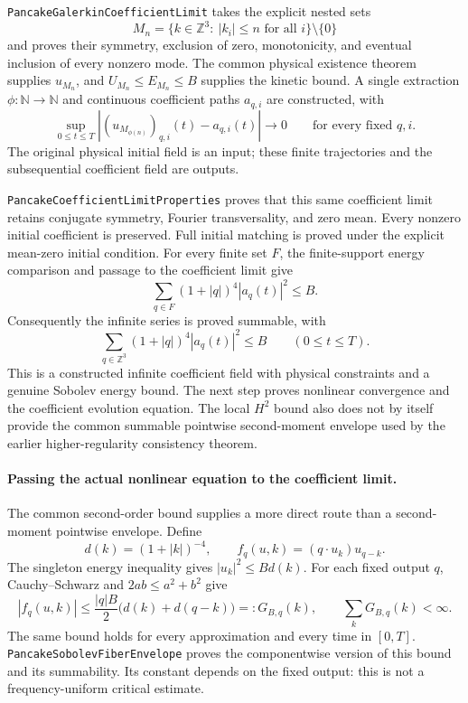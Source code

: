 \documentclass[11pt]{article}
\theoremstyle{definition}
\begin{document}
\texttt{PancakeGalerkinCoefficientLimit} takes the explicit nested
sets
\[
 M_n=\{k\in\mathbb Z^3:\ |k_i|\le n\text{ for all }i\}\setminus\{0\}
\]
and proves their symmetry, exclusion of zero, monotonicity, and
eventual inclusion of every nonzero mode. The common physical
existence theorem supplies $u_{M_n}$, and $U_{M_n}\le E_{M_n}\le B$
supplies the kinetic bound. A single extraction $\phi:\mathbb N\to
\mathbb N$ and continuous coefficient paths $a_{q,i}$ are constructed,
with
\[
 \sup_{0\le t\le T}
       |(u_{M_{\phi(n)}})_{q,i}(t)-a_{q,i}(t)|
            \longrightarrow0
       \qquad\text{for every fixed }q,i .
\]
The original physical initial field is an input; these finite
trajectories and the subsequential coefficient field are outputs.

\texttt{PancakeCoefficientLimitProperties} proves that this same
coefficient limit retains conjugate symmetry, Fourier transversality,
and zero mean. Every nonzero initial coefficient is preserved.
Full initial matching is proved under the explicit mean-zero
initial condition. For every finite set $F$, the finite-support
energy comparison and passage to the coefficient limit give
\[
 \sum_{q\in F}(1+|q|)^4|a_q(t)|^2\le B .
\]
Consequently the infinite series is proved summable, with
\[
 \boxed{\qquad
   \sum_{q\in\mathbb Z^3}(1+|q|)^4|a_q(t)|^2\le B
       \qquad(0\le t\le T).
 \qquad}
\]
This is a constructed infinite coefficient field with physical
constraints and a genuine Sobolev energy bound. The next step proves
nonlinear convergence and the coefficient evolution equation.
The local $H^2$ bound also does not by itself provide the common
summable pointwise second-moment envelope used by the earlier
higher-regularity consistency theorem.

\paragraph{Passing the actual nonlinear equation to the coefficient limit.}
The common second-order bound supplies a more direct route than a
second-moment pointwise envelope. Define
\[
 d(k)=(1+|k|)^{-4},\qquad
 f_q(u,k)=(q\cdot u_k)u_{q-k}.
\]
The singleton energy inequality gives $|u_k|^2\le B d(k)$.
For each fixed output $q$, Cauchy--Schwarz and $2ab\le a^2+b^2$ give
\[
 |f_q(u,k)|\le
       \frac{|q|B}{2}\bigl(d(k)+d(q-k)\bigr)
       =:G_{B,q}(k),
 \qquad \sum_k G_{B,q}(k)<\infty.
\]
The same bound holds for every approximation and every time in $[0,T]$.
\texttt{PancakeSobolevFiberEnvelope} proves the componentwise version of
this bound and its summability. Its constant depends on the fixed output:
this is not a frequency-uniform critical estimate.
\end{document}
